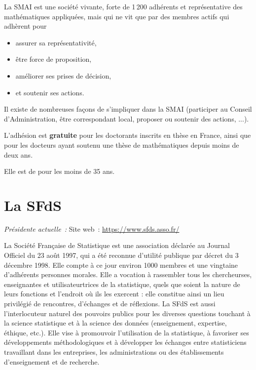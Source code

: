 La SMAI est une soci\'et\'e vivante, forte de 1\,200 adh\'erents
et repr\'esentative des math\'ematiques appliqu\'ees, mais
qui ne vit que par des membres actifs qui adh\`erent pour
\begin{itemize}%
    \item assurer sa repr\'esentativit\'e,
    \item \^etre force de proposition,
    \item am\'eliorer ses prises de d\'ecision,
    \item et soutenir ses actions.
\end{itemize}
Il existe de nombreuses fa\c cons de s'impliquer dans la SMAI
(participer au Conseil d'Administration, \^etre correspondant local,
proposer ou soutenir des actions, ...).

L'adh\'esion est \textbf{gratuite} pour les doctorants inscrits en th\`ese en France, 
ainsi que pour les docteurs ayant soutenu une th\`ese de math\'ematiques depuis moins de deux ans.

Elle est de  pour les moins de 35 ans.

\section{La SFdS}

\emph{Pr\'esident\mp e actuel\mp le~: } \hfill Site web~: \url{https://www.sfds.asso.fr/}
\smallskip

La Soci\'et\'e Fran\c{c}aise de Statistique est une association d\'eclar\'ee au Journal Officiel du 23 ao\^ut 1997, qui a \'et\'e reconnue d'utilit\'e publique par d\'ecret du 3 d\'ecembre 1998. Elle compte \`a ce jour environ 1000 membres et une vingtaine d'adh\'erents personnes morales. Elle a vocation \`a rassembler tous les chercheur\mp ses, enseignant\mp es et utilisateur\mp trices de la statistique, quels que soient la nature de leurs fonctions et l'endroit o\`u ils les exercent : elle constitue ainsi un lieu privil\'egi\'e de rencontres, d'\'echanges et de r\'eflexions. La SFdS est aussi l'interlocuteur naturel des pouvoirs publics pour les diverses questions touchant \`a la science statistique et \`a la science des donn\'ees (enseignement, expertise, \'ethique, etc.). Elle vise \`a promouvoir l'utilisation de la statistique, \`a favoriser ses d\'eveloppements m\'ethodologiques et \`a d\'evelopper les \'echanges entre statisticiens travaillant dans les entreprises, les administrations ou des \'etablissements d'enseignement et de recherche.

